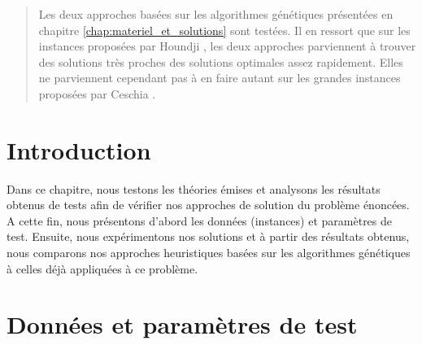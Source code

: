 \begin{abstract}
	Les deux approches basées sur les algorithmes génétiques présentées en chapitre \ref{chap:materiel_et_solutions} sont testées. Il en ressort que sur les instances proposées par Houndji \cite{houndji_thesis}, les deux approches parviennent à trouver des solutions très proches des solutions optimales assez rapidement. Elles ne parviennent cependant pas à en faire autant sur les grandes instances proposées par Ceschia \cite{ceschia}.
\end{abstract}

\section*{Introduction}
		Dans ce chapitre, nous testons les théories émises et analysons les résultats obtenus de tests afin de vérifier nos approches de solution du problème énoncées. A cette fin, nous présentons d'abord les données (instances) et paramètres de test. Ensuite, nous expérimentons nos solutions et à partir des résultats obtenus, nous comparons nos approches heuristiques basées sur les algorithmes génétiques à celles déjà appliquées à ce problème.
		
\section{Données et paramètres de test}
